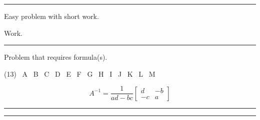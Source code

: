 \noindent\rule{\textwidth}{1pt}

\begin{question}[class=Z]{3}
  \label{question:easy-problem}
  Easy problem with short work.
\end{question}
\begin{minipage}{0.75\textwidth}
  \begin{solution}
    Work.
  \end{solution}
\end{minipage}\hspace{\fill}%
\begin{minipage}{0.25\textwidth}
  \vspace{0.1in}
\end{minipage}

\noindent\rule{\textwidth}{1pt}

\begin{question}[class=Z]{6}
  \label{question:formula-problem}
  Problem that requires formula(s).
  \begin{tasks}(13)
    \task[\selectall] \ A
    \task[\selectall] \ B
    \task[\selectall] \ C
    \task[\selectall] \ D
    \task[\selectall] \ E
    \task[\selectall] \ F
    \task[\selectall] \ G
    \task[\correctselectall] \ H
    \task[\selectall] \ I
    \task[\selectall] \ J
    \task[\selectall] \ K
    \task[\selectall] \ L
    \task[\selectall] \ M
  \end{tasks}
\end{question}
\begin{minipage}{0.75\textwidth}
  \begin{solution}
    \[A^{-1} = \dfrac{1}{ad - bc}
      \begin{bmatrix}
        d & -b \\
        -c & a
      \end{bmatrix}
    \]
  \end{solution}
\end{minipage}\hspace{\fill}%
\begin{minipage}{0.25\textwidth}
  \vspace{0.5in}
  \vspace{0.1in}
\end{minipage}

\noindent\rule{\textwidth}{1pt}



\noindent\rule{\textwidth}{1pt}

